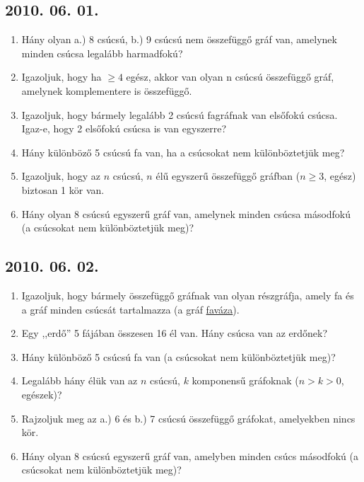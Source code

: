 \subsection*{2010. 06. 01.}
\begin{enumerate}
\item Hány olyan a.) 8 csúcsú, b.) 9 csúcsú nem összefüggő gráf van, amelynek minden csúcsa legalább harmadfokú?
\item Igazoljuk, hogy ha $\geq 4$ egész, akkor van olyan n csúcsú összefüggő gráf, amelynek komplementere is összefüggő.
\item Igazoljuk, hogy bármely legalább 2 csúcsú fagráfnak van elsőfokú csúcsa. Igaz-e, hogy 2 elsőfokú csúcsa is van egyszerre?
\item Hány különböző 5 csúcsú fa van, ha a csúcsokat nem különböztetjük meg?
\item Igazoljuk, hogy az $n$ csúcsú, $n$ élű egyszerű összefüggő gráfban ($n\geq 3$, egész) biztosan 1 kör van.
\item Hány olyan 8 csúcsú egyszerű gráf van, amelynek minden csúcsa másodfokú (a csúcsokat nem különböztetjük meg)?
\end{enumerate}

\subsection*{2010. 06. 02.}
\begin{enumerate}
\item Igazoljuk, hogy bármely összefüggő gráfnak van olyan részgráfja, amely fa és a gráf  minden csúcsát tartalmazza (a gráf \underline{faváza}).
\item  Egy ,,erdő'' 5 fájában összesen 16 él van. Hány csúcsa van az erdőnek?
\item Hány különböző 5 csúcsú fa van (a csúcsokat nem különböztetjük meg)?
\item Legalább hány élük van az $n$ csúcsú, $k$ komponensű gráfoknak ($n>k>0$, egészek)?
\item Rajzoljuk meg az a.) 6 és b.) 7 csúcsú összefüggő gráfokat, amelyekben nincs kör.
\item Hány olyan 8 csúcsú egyszerű gráf van, amelyben minden csúcs másodfokú (a csúcsokat nem különböztetjük meg)?
\end{enumerate}

